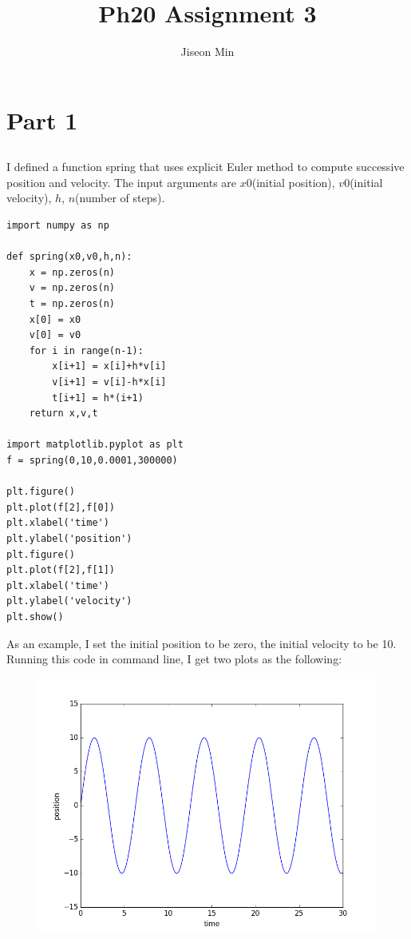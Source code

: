 \documentclass[10pt]{article}
\begin{document}
\pagestyle{fancy}
\cfoot{\thepage/\pageref{LastPage}}
\title{Ph20 Assignment 3}
\author{Jiseon Min}
\maketitle

\section{Part 1}
\subsection{}
I defined a function spring that uses explicit Euler method to compute successive position and velocity. The input arguments are $x0$(initial position), $v0$(initial velocity), $h$, $n$(number of steps).

\begin{lstlisting}
import numpy as np

def spring(x0,v0,h,n):
    x = np.zeros(n)
    v = np.zeros(n)
    t = np.zeros(n)
    x[0] = x0
    v[0] = v0
    for i in range(n-1):
        x[i+1] = x[i]+h*v[i]
        v[i+1] = v[i]-h*x[i]
        t[i+1] = h*(i+1)
    return x,v,t

import matplotlib.pyplot as plt
f = spring(0,10,0.0001,300000)

plt.figure()
plt.plot(f[2],f[0])
plt.xlabel('time')
plt.ylabel('position')
plt.figure()
plt.plot(f[2],f[1])
plt.xlabel('time')
plt.ylabel('velocity')
plt.show()
\end{lstlisting}

As an example, I set the initial position to be zero, the initial velocity to be 10. Running this code in command line, I get two plots as the following:\\

\begin{figure}[!h]
	\centering
	\includegraphics[scale=0.5]{w3fig1.png}
\end{figure}
\end{document}
